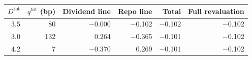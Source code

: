 {\small\begin{tabular}{rrrrrr}
\toprule
$D^{\mathrm{tot}}$ & $q^{\mathrm{tot}}$ (bp) & Dividend line & Repo line & Total & Full revaluation \\
\midrule
\num{3.5} & \num{80} & \num{-0.000} & \num{-0.102} & \num{-0.102} & \num{-0.102} \\
\num{3.0} & \num{132} & \num{0.264} & \num{-0.365} & \num{-0.101} & \num{-0.102} \\
\num{4.2} & \num{7} & \num{-0.370} & \num{0.269} & \num{-0.101} & \num{-0.102} \\
\bottomrule
\end{tabular}}
